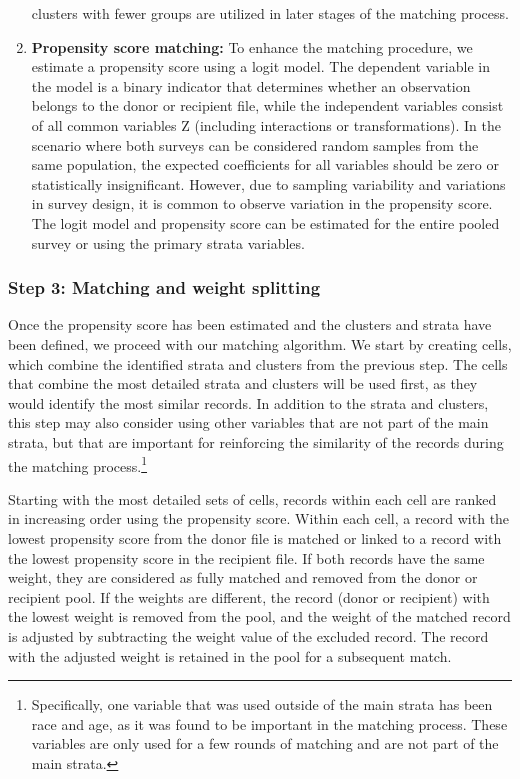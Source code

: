 \documentclass[
  11pt,
]{article}
\begin{document}
\begin{enumerate}
  clusters with fewer groups are utilized in later stages of the
  matching process.
\item
  \textbf{Propensity score matching:} To enhance the matching procedure,
  we estimate a propensity score using a logit model. The dependent
  variable in the model is a binary indicator that determines whether an
  observation belongs to the donor or recipient file, while the
  independent variables consist of all common variables Z (including
  interactions or transformations). In the scenario where both surveys
  can be considered random samples from the same population, the
  expected coefficients for all variables should be zero or
  statistically insignificant. However, due to sampling variability and
  variations in survey design, it is common to observe variation in the
  propensity score. The logit model and propensity score can be
  estimated for the entire pooled survey or using the primary strata
  variables.
\end{enumerate}

\subsubsection{Step 3: Matching and weight
splitting}\label{step-3-matching-and-weight-splitting}

Once the propensity score has been estimated and the clusters and strata
have been defined, we proceed with our matching algorithm. We start by
creating cells, which combine the identified strata and clusters from
the previous step. The cells that combine the most detailed strata and
clusters will be used first, as they would identify the most similar
records. In addition to the strata and clusters, this step may also
consider using other variables that are not part of the main strata, but
that are important for reinforcing the similarity of the records during
the matching process.\footnote{Specifically, one variable that was used
  outside of the main strata has been race and age, as it was found to
  be important in the matching process. These variables are only used
  for a few rounds of matching and are not part of the main strata.}

Starting with the most detailed sets of cells, records within each cell
are ranked in increasing order using the propensity score. Within each
cell, a record with the lowest propensity score from the donor file is
matched or linked to a record with the lowest propensity score in the
recipient file. If both records have the same weight, they are
considered as fully matched and removed from the donor or recipient
pool. If the weights are different, the record (donor or recipient) with
the lowest weight is removed from the pool, and the weight of the
matched record is adjusted by subtracting the weight value of the
excluded record. The record with the adjusted weight is retained in the
pool for a subsequent match.
\end{document}
